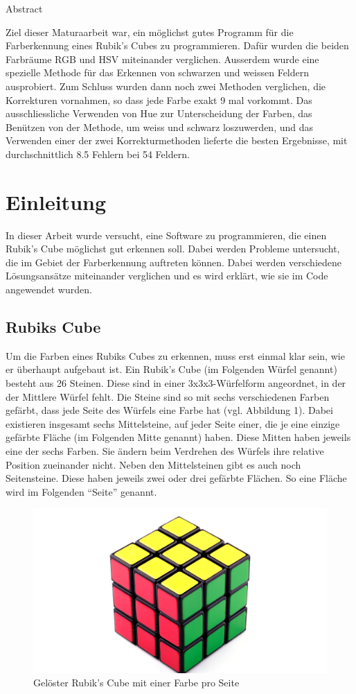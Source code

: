 \documentclass[a4paper, 12pt]{article}
\begin{document}
Abstract

Ziel dieser Maturaarbeit war, ein möglichst gutes Programm für die Farberkennung eines Rubik's Cubes zu programmieren. Dafür wurden die beiden Farbräume RGB und HSV miteinander verglichen. Ausserdem wurde eine spezielle Methode für das Erkennen von schwarzen und weissen Feldern ausprobiert. Zum Schluss wurden dann noch zwei Methoden verglichen, die Korrekturen vornahmen, so dass jede Farbe exakt 9 mal vorkommt. Das ausschliessliche Verwenden von Hue zur Unterscheidung der Farben, das Benützen von der Methode, um weiss und schwarz loszuwerden, und das Verwenden einer der zwei Korrekturmethoden lieferte die besten Ergebnisse, mit durchschnittlich 8.5 Fehlern bei 54 Feldern. 
\tableofcontents
\newpage
\section{Einleitung}
In dieser Arbeit wurde versucht, eine Software zu programmieren, die einen Rubik's Cube möglichst gut erkennen soll. Dabei werden Probleme untersucht, die im Gebiet der Farberkennung auftreten können. Dabei werden verschiedene Lösungsansätze miteinander verglichen und es wird erklärt, wie sie im Code angewendet wurden.
\subsection{Rubiks Cube}
Um die Farben eines Rubiks Cubes zu erkennen, muss erst einmal klar sein, wie er überhaupt aufgebaut ist. Ein Rubik's Cube (im Folgenden Würfel genannt) besteht aus 26 Steinen. Diese sind in einer 3x3x3-Würfelform angeordnet, in der der Mittlere Würfel fehlt. Die Steine sind so mit sechs verschiedenen Farben gefärbt, dass jede Seite des Würfels eine Farbe hat (vgl. Abbildung 1). Dabei existieren insgesamt sechs Mittelsteine, auf jeder Seite einer, die je eine einzige gefärbte Fläche (im Folgenden Mitte genannt) haben. Diese Mitten haben jeweils eine der sechs Farben. Sie ändern beim Verdrehen des Würfels ihre relative Position zueinander nicht. Neben den Mittelsteinen gibt es auch noch Seitensteine. Diese haben jeweils zwei oder drei gefärbte Flächen. So eine Fläche wird im Folgenden "`Seite"' genannt.
\begin{figure}[H]
\includegraphics[scale=1.5]{Wuerfel_Billd}
\caption{Gelöster Rubik's Cube mit einer Farbe pro Seite}
\end{figure}
\end{document}
